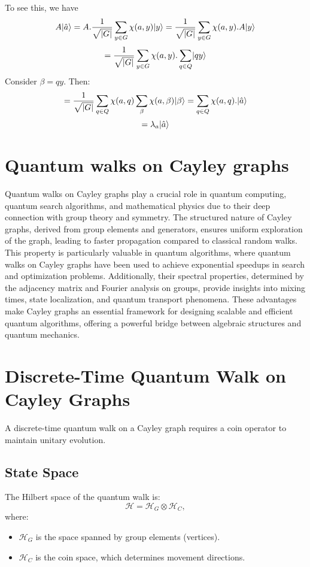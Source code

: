 \documentclass[11pt]{article}
\theoremstyle{definition}
\begin{document}
To see this, we have
\[
        A\lvert\hat{a}\rangle = A.\frac{1}{\sqrt{|G|}}\sum_{y \in G}\chi(a,y)\lvert y\rangle = \frac{1}{\sqrt{|G|}}\sum_{y \in G}\chi(a,y).A\lvert y\rangle
        \]
        \[
        = \frac{1}{\sqrt{|G|}}\sum_{y \in G}\chi(a,y).\sum_{q \in Q}\lvert qy\rangle
        \]
        Consider $\beta = qy$. Then:
        \[
         = \frac{1}{\sqrt{|G|}}\sum_{q \in Q}\chi(a,q)\sum_{\beta}\chi(a,\beta)\lvert\beta\rangle = \sum_{q \in Q}\chi(a,q) . \lvert\hat{a}\rangle
        \]
        \[
         = \lambda_a\lvert\hat{a}\rangle
        \]




\section*{Quantum walks on Cayley graphs}
Quantum walks on Cayley graphs play a crucial role in quantum computing, quantum search algorithms, and mathematical physics due to their deep connection with group theory and symmetry. The structured nature of Cayley graphs, derived from group elements and generators, ensures uniform exploration of the graph, leading to faster propagation compared to classical random walks. This property is particularly valuable in quantum algorithms, where quantum walks on Cayley graphs have been used to achieve exponential speedups in search and optimization problems. Additionally, their spectral properties, determined by the adjacency matrix and Fourier analysis on groups, provide insights into mixing times, state localization, and quantum transport phenomena. These advantages make Cayley graphs an essential framework for designing scalable and efficient quantum algorithms, offering a powerful bridge between algebraic structures and quantum mechanics.




\section*{Discrete-Time Quantum Walk on Cayley Graphs}

A discrete-time quantum walk on a Cayley graph requires a coin operator to maintain unitary evolution.

\subsection*{State Space}
The Hilbert space of the quantum walk is:
\[
\mathcal{H} = \mathcal{H}_G \otimes \mathcal{H}_C,
\]
where:
\begin{itemize}
    \item \( \mathcal{H}_G \) is the space spanned by group elements (vertices).
    \item \( \mathcal{H}_C \) is the coin space, which determines movement directions.
\end{itemize}
\end{document}
